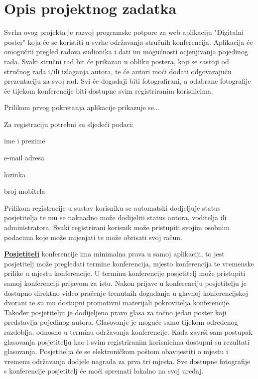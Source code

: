 \chapter{Opis projektnog zadatka}
		
		Svrha ovog projekta je razvoj programske potpore za web aplikaciju "Digitalni poster" koja će se koristiti u svrhe održavanja stručnih konferencija. Aplikacija će omogućiti pregled radova sudionika i dati im mogućnosti ocjenjivanja pojedinog rada. Svaki stručni rad bit će prikazan u obliku postera, koji se sastoji od stručnog rada i/ili izlaganja autora, te će autori moći dodati odgovarajuću prezentaciju za svoj rad. Svi će događaji biti fotografirani, a odabrane fotografije će tijekom konferencije biti dostupne svim registriranim korisnicima.

		Prilikom prvog pokretanja aplikacije prikazuje se...

		Za registraciju potrebni su sljedeći podaci:

		\begin{packed_item}
			\item {ime i prezime}
			\item {e-mail adresa}
			\item {lozinka}
			\item {broj mobitela}
		\end{packed_item}
		Prilikom registracije u sustav korisniku se automatski dodjeljuje status posjetitelja te mu se naknadno može dodijeliti status autora, voditelja ili administratora. Svaki registrirani korisnik može pristupiti svojim osobnim podacima koje može mijenjati te može obrisati svoj račun.

		\textbf{\underline{Posjetitelj}} konferencije ima minimalna prava u samoj aplikaciji, to jest posjetitelj može pregledati termine konferencija, mjesto konferencija te vremenske prilike u mjestu konferencije. U terminu konferencije posjetitelj može pristupiti samoj konferenciji prijavom za istu. Nakon prijave u konferenciju posjetitelju je dostupno direktno video praćenje trenutnih događanja u glavnoj konferencijskoj dvorani te su mu dostupni promotivni materijali pokrovitelja konferencije. Također posjetitelju je dodijeljeno pravo glasa za točno jedan poster koji predstavlja pojedinog autora. Glasovanje je moguće samo tijekom određenog razdoblja, odnosno u terminu održavanja konferencije. Kada završi sam postupak glasovanja posjetitelju kao i svim registriranim korisnicima dostupni su rezultati glasovanja. Posjetitelja će se elektroničkom poštom obavijestiti o mjestu i vremenu održavanja dodjele nagrada za prva tri mjesta. Sve dostupne fotografije s konferencije posjetitelj će moći spremati lokalno na svoj uređaj.

